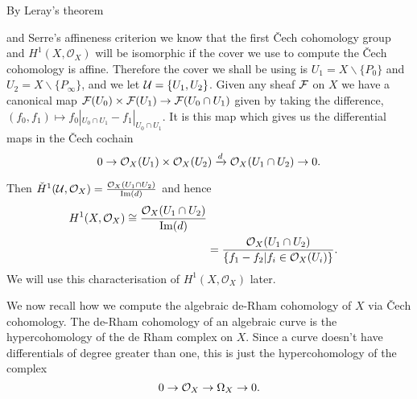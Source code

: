 \documentclass[draft, 11pt]{article} %
\theoremstyle{plain}
\theoremstyle{remark}
\newcommand{\cO}{{\cal O}}
\newcommand{\cech}{\v{C}ech }
\newcommand{\hone}{H^1(X,\mathcal{O}_X)}
\newcommand{\cechhone}{\check{H}^1(\mathcal U,\mathcal O_X)}
\DeclareMathOperator{\Ima}{Im}
\begin{document}
By Leray's theorem { and Serre's affineness criterion  we know that the first \cech cohomology group and $\hone$ will be isomorphic if the cover we use to compute the \cech cohomology is affine.
Therefore the cover we shall be using is $U_1 = X\backslash \{ P_0 \}$ and $U_2 = X\backslash \{ P_\infty \}$, and we let ${\cal U} = \{ U_1, U_2\}$.
Given any sheaf $\cal F$ on $X$ we have a canonical map ${\cal F}(U_0) \times {\cal F} (U_1) \rightarrow {\cal F}(U_0 \cap U_1)$ given by taking the difference, $(f_0,f_1) \mapsto f_0|_{U_0 \cap U_1} - f_1|_{U_0 \cap U_1}$.
It is this map which gives us the differential maps in the \cech cochain
\begin{equation*}
0 \rightarrow \cO_X(U_1)\times \cO_X(U_2) \xrightarrow{d} \cO_X(U_1 \cap U_2) \rightarrow 0.
\end{equation*}

Then $\cechhone = \frac{\cO_X(U_1 \cap U_2)}{\Ima(d)}$ and hence
\begin{equation}
\begin{split}
\hone \cong \frac{\cO_X(U_1 \cap U_2)}{\Ima(d)}  \\
& = \frac{\cO_X(U_1 \cap U_2)}{\{f_1 - f_2 | f_i \in \cO_X(U_i) \}}.
\end{split}
\end{equation}
We will use this characterisation of $\hone$ later.

We now recall how we compute the algebraic de-Rham cohomology of $X$ via \cech cohomology.
The de-Rham cohomology of an algebraic curve is the hypercohomology of the de Rham complex on $X$. 
Since a curve doesn't have differentials of degree greater than one, this is just the hypercohomology of the complex
\begin{equation}\label{res}
0 \rightarrow \cO_X \rightarrow \Omega_X \rightarrow 0.
\end{equation}

}
\end{document}
